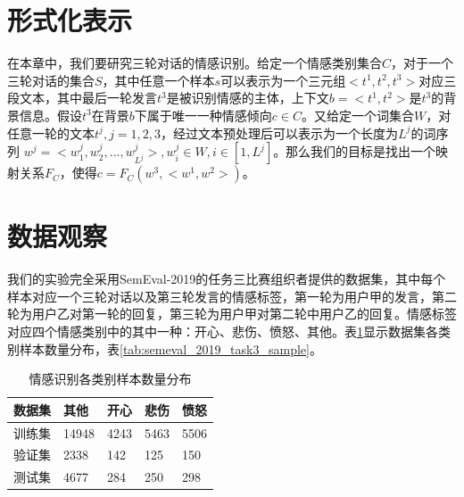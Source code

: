 \section{形式化表示}
\label{sec:exp_context_emo_format}

在本章中，我们要研究三轮对话的情感识别。给定一个情感类别集合$C$，对于一个三轮对话的集合$S$，其中任意一个样本$s$可以表示为一个三元组$<t^1, t^2, t^3>$对应三段文本，其中最后一轮发言$t^3$是被识别情感的主体，上下文$b=<t^1, t^2>$是$t^3$的背景信息。假设$t^3$在背景$b$下属于唯一一种情感倾向$c \in C$。又给定一个词集合$W$，对任意一轮的文本$t^j, j=1,2,3$，经过文本预处理后可以表示为一个长度为$L^j$的词序列 $w^j = <w^j_1, w^j_2, ..., w^j_{L^j}>, w^j_i \in W, i \in [1, L^j]$。那么我们的目标是找出一个映射关系$F_C$，使得$c=F_C(w^3, <w^1, w^2>)$。

\section{数据观察}
\label{sec:exp_context_emo_data}

我们的实验完全采用SemEval-2019的任务三比赛组织者提供的数据集，其中每个样本对应一个三轮对话以及第三轮发言的情感标签，第一轮为用户甲的发言，第二轮为用户乙对第一轮的回复，第三轮为用户甲对第二轮中用户乙的回复。情感标签对应四个情感类别中的其中一种：开心、悲伤、愤怒、其他。表\ref{tab:semeval_2019_task3_data}显示数据集各类别样本数量分布，表\ref{tab:semeval_2019_task3_sample}。

\begin{table}[htb]
  \centering
  \begin{minipage}[t]{0.8\linewidth}
  \caption{情感识别各类别样本数量分布}
  \label{tab:semeval_2019_task3_data}
    \begin{tabularx}{\linewidth}{X|XXXX}
    \toprule[1.5pt]
    数据集 & 其他 & 开心 & 悲伤 & 愤怒 \\  
    \hline
    训练集 & 14948 & 4243 & 5463 & 5506 \\
    验证集 & 2338 & 142 & 125 & 150 \\
    测试集 & 4677 & 284 & 250 & 298 \\
    \bottomrule[1.5pt]
    \end{tabularx}
  \end{minipage}
\end{table}

